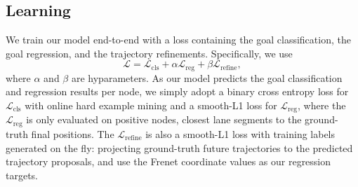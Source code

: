 \subsection{Learning}
\label{sec:learning}
We train our model end-to-end with a loss containing the goal classification, the goal
regression, and the trajectory refinements. Specifically, we use
$$
\label{eq:objective}
\mathcal{L} = \mathcal{L}_{\text{cls}} + \alpha\mathcal{L}_{\text{reg}} +
\beta\mathcal{L}_{\text{refine}},
$$
where $\alpha$ and $\beta$ are hyparameters.
As our model predicts the goal classification and regression results per node, we simply adopt a binary cross entropy loss for $\mathcal{L}_{\text{cls}}$ with online hard example mining \cite{ohem} and a smooth-L1 loss for $\mathcal{L}_{\text{reg}}$, where
the $\mathcal{L}_{\text{reg}}$ is only evaluated on positive nodes, \ie closest lane
segments to the ground-truth final positions. The $\mathcal{L}_{\text{refine}}$ is also
a smooth-L1 loss with training labels generated on the fly: projecting
ground-truth future trajectories to the predicted trajectory proposals, and use
the Frenet coordinate values as our regression targets.




























